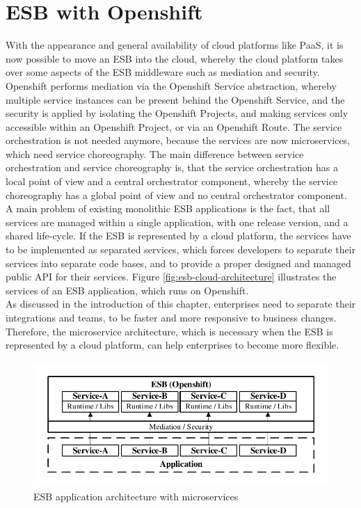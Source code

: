 \section{ESB with Openshift}
\label{sec:esb-as-cloud}
With the appearance and general availability of cloud platforms like PaaS, it is now possible to move an ESB into the cloud, whereby the cloud platform takes over some aspects of the ESB middleware such as mediation and security. Openshift performs mediation via the Openshift Service abstraction, whereby multiple service instances can be present behind the Openshift Service, and the security is applied by isolating the Openshift Projects, and making services only accessible within an Openshift Project, or via an Openshift Route. The service orchestration is not needed anymore, because the services are now microservices, which need service choreography. The main difference between service orchestration and service choreography is, that the service orchestration has a local point of view and a central orchestrator component, whereby the service choreography has a global point of view and no central orchestrator component\cite{Richards2015}. \\

A main problem of existing monolithic ESB applications is the fact, that all services are managed within a single application, with one release version, and a shared life-cycle. If the ESB is represented by a cloud platform, the services have to be implemented as separated services, which forces developers to separate their services into separate code bases, and to provide a proper designed and managed public API for their services. Figure \vref{fig:esb-cloud-architecture} illustrates the services of an ESB application, which runs on Openshift. \\

As discussed in the introduction of this chapter, enterprises need to separate their integrations and teams, to be faster and more responsive to business changes. Therefore, the microservice architecture, which is necessary when the ESB is represented by a cloud platform, can help enterprises to become more flexible.

\begin{figure}[htbp]
	\centering
	\includegraphics[scale=1]{images/esb-cloud-architecture.pdf}
	\caption{ESB application architecture with microservices}
	\label{fig:esb-cloud-architecture}
\end{figure} 

